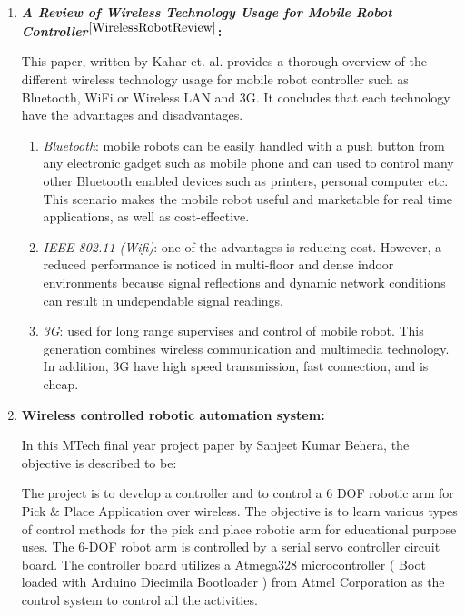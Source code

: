 \begin{enumerate}
		
	\item \textbf{\textit{A Review of Wireless Technology Usage for Mobile Robot Controller}${}^{\cite{WirelessRobotReview}}$:} 
	
		This paper, written by Kahar et. al. provides a thorough overview of the  different wireless technology usage for mobile robot controller such as Bluetooth, WiFi or Wireless LAN and 3G. It concludes that each
		technology have the advantages and disadvantages. 
		\begin{enumerate}
			\item \textit{Bluetooth}: mobile robots can be easily handled with a push button from any electronic gadget such as mobile phone and can used to control many other
			Bluetooth enabled devices such as printers, personal computer etc. This scenario makes the mobile robot useful and marketable for real time applications, as well as cost-effective.
			
			\item \textit{IEEE 802.11 (Wifi)}: one of the advantages is reducing cost. However, a reduced performance is noticed in multi-floor and dense indoor environments because signal reflections and dynamic network conditions can result in undependable signal readings.
			
			\item \textit{3G}: used for long range supervises and control of mobile robot. This generation
			combines wireless communication and multimedia technology. In addition, 3G have high speed transmission, fast connection, and is cheap.
		\end{enumerate}
		
	
	\item \textbf{Wireless controlled robotic automation system:} 
	
		In this MTech final year project paper by Sanjeet Kumar Behera, the objective is described to be:
		
		\begin{displayquote}
			The project is to develop a controller and to control a 6 DOF robotic arm for Pick \& Place Application over wireless. The objective is to learn various types of control methods for the pick and place robotic arm for educational purpose uses. The 6-DOF robot arm is controlled by a serial servo controller circuit board. The controller board utilizes a Atmega328 microcontroller ( Boot loaded with Arduino Diecimila Bootloader ) from Atmel Corporation as the control system to control all the activities. 
			

\end{displayquote}
\end{enumerate}
